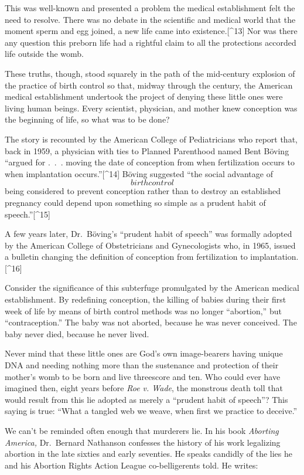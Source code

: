 \documentclass[
]{book}
\begin{document}
This was well-known and presented a problem the medical establishment felt the need to resolve. There was no debate in the scientific and medical world that the moment sperm and egg joined, a new life came into existence.{[}\^{}13{]} Nor was there any question this preborn life had a rightful claim to all the protections accorded life outside the womb.

These truths, though, stood squarely in the path of the mid-century explosion of the practice of birth control so that, midway through the century, the American medical establishment undertook the project of denying these little ones were living human beings. Every scientist, physician, and mother knew conception was the beginning of life, so what was to be done?

The story is recounted by the American College of Pediatricians who report that, back in 1959, a physician with ties to Planned Parenthood named Bent Böving ``argued for .~.~. moving the date of conception from when fertilization occurs to when implantation occurs.''{[}\^{}14{]} Böving suggested ``the social advantage of \[birth control\] being considered to prevent conception rather than to destroy an established pregnancy could depend upon something so simple as a prudent habit of speech.''{[}\^{}15{]}

A few years later, Dr.~Böving's ``prudent habit of speech'' was formally adopted by the American College of Obstetricians and Gynecologists who, in 1965, issued a bulletin changing the definition of conception from fertilization to implantation.{[}\^{}16{]}

Consider the significance of this subterfuge promulgated by the American medical establishment. By redefining conception, the killing of babies during their first week of life by means of birth control methods was no longer ``abortion,'' but ``contraception.'' The baby was not aborted, because he was never conceived. The baby never died, because he never lived.

Never mind that these little ones are God's own image-bearers having unique DNA and needing nothing more than the sustenance and protection of their mother's womb to be born and live threescore and ten. Who could ever have imagined then, eight years before \emph{Roe v. Wade}, the monstrous death toll that would result from this lie adopted as merely a ``prudent habit of speech''? This saying is true: ``What a tangled web we weave, when first we practice to deceive.''

We can't be reminded often enough that murderers lie. In his book \emph{Aborting America,} Dr.~Bernard Nathanson confesses the history of his work legalizing abortion in the late sixties and early seventies. He speaks candidly of the lies he and his Abortion Rights Action League co-belligerents told. He writes:
\end{document}
